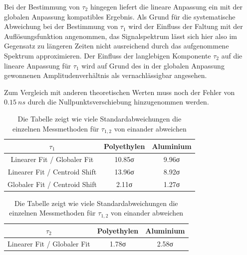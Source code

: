 \documentclass[a4paper,12pt]{article}
\begin{document}
Bei der Bestimmung von $\tau_{2}$
hingegen liefert die lineare Anpassung ein mit der globalen Anpassung kompatibles Ergebnis. Als Grund für die systematische Abweichung bei der
Bestimmung von $\tau_{1}$ wird der Einfluss der Faltung mit der Auflösungsfunktion angenommen, das Signalspektrum lässt sich hier also im Gegensatz zu längeren
Zeiten nicht ausreichend durch das aufgenommene Spektrum approximieren. Der Einfluss der langlebigen Komponente $\tau_{2}$ auf die lineare Anpassung für $\tau_{1}$
wird auf Grund des in der globalen Anpassung gewonnenen Amplitudenverhältnis als vernachlässigbar angesehen.

Zum Vergleich mit anderen theoretischen Werten muss noch der Fehler von $\SI{0.15}{ns}$ durch die
Nullpunktsverschiebung hinzugenommen werden.
\begin{table}[h]
	\centering
	\begin{tabular}{c |c |c }
	$\tau_{1}$ & Polyethylen & Aluminium \\
	\hline
	Linearer Fit / Globaler Fit   & 10.85σ & 9.96σ \\
	Linearer Fit / Centroid Shift & 13.96σ & 8.92σ  \\
	Globaler Fit / Centroid Shift &  2.11σ & 1.27σ \\
	\end{tabular}

	\vspace*{0.5cm}
	\begin{tabular}{c |c |c }
	$\tau_{2}$ & Polyethylen & Aluminium\\
	\hline
	Linearer Fit / Globaler Fit\hspace*{0.37cm} & 1.78σ & 2.58σ\\
	\end{tabular}
	\caption{Die Tabelle zeigt wie viele Standardabweichungen die einzelnen Messmethoden für $\tau_{1,2}$ von einander abweichen}
	\label{tab:finalsigma}
\end{table}
\end{document}
